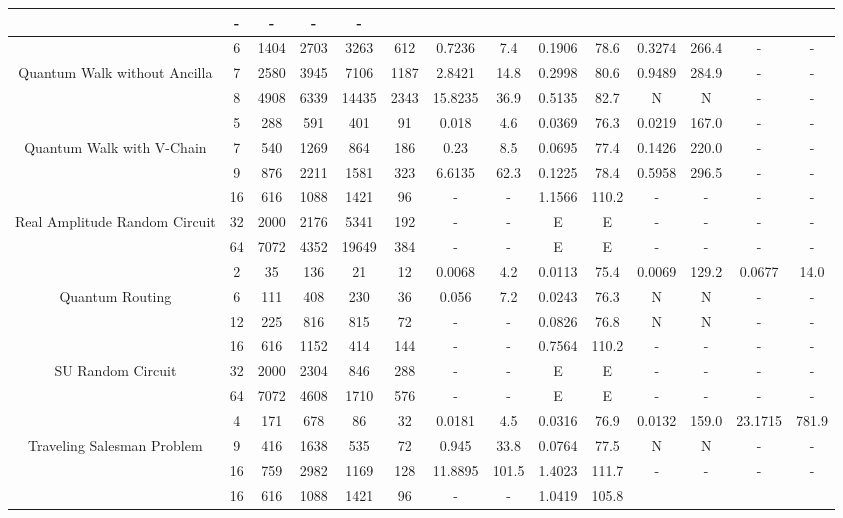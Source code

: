 \begin{table}[htb]
{\begin{tabular}{|c|c|c|c|c|c|c|c|c|c|c|c|c|c|}
 & - & -
 & - & -
 \\
\hline
 & 
6 & 1404 & 2703 & 3263 & 612
 & 0.7236 & 7.4
 & 0.1906 & 78.6
 & 0.3274 & 266.4
 & - & -
 \\
Quantum Walk without Ancilla & 
7 & 2580 & 3945 & 7106 & 1187
 & 2.8421 & 14.8
 & 0.2998 & 80.6
 & 0.9489 & 284.9
 & - & -
 \\
 & 
8 & 4908 & 6339 & 14435 & 2343
 & 15.8235 & 36.9
 & 0.5135 & 82.7
 & N & N 
 & - & -
 \\
\hline
 & 
5 & 288 & 591 & 401 & 91
 & 0.018 & 4.6
 & 0.0369 & 76.3
 & 0.0219 & 167.0
 & - & -
 \\
Quantum Walk with V-Chain & 
7 & 540 & 1269 & 864 & 186
 & 0.23 & 8.5
 & 0.0695 & 77.4
 & 0.1426 & 220.0
 & - & -
 \\
 & 
9 & 876 & 2211 & 1581 & 323
 & 6.6135 & 62.3
 & 0.1225 & 78.4
 & 0.5958 & 296.5
 & - & -
 \\
\hline
 & 
16 & 616 & 1088 & 1421 & 96
 & - & -
 & 1.1566 & 110.2
 & - & -
 & - & -
 \\
Real Amplitude Random Circuit & 
32 & 2000 & 2176 & 5341 & 192
 & - & -
 & E & E
 & - & -
 & - & -
 \\
 & 
64 & 7072 & 4352 & 19649 & 384
 & - & -
 & E & E
 & - & -
 & - & -
 \\
\hline
 & 
2 & 35 & 136 & 21 & 12
 & 0.0068 & 4.2
 & 0.0113 & 75.4
 & 0.0069 & 129.2
 & 0.0677 & 14.0
 \\
Quantum Routing & 
6 & 111 & 408 & 230 & 36
 & 0.056 & 7.2
 & 0.0243 & 76.3
 & N & N 
 & - & -
 \\
 & 
12 & 225 & 816 & 815 & 72
 & - & -
 & 0.0826 & 76.8
 & N & N 
 & - & -
 \\
\hline
 & 
16 & 616 & 1152 & 414 & 144
 & - & -
 & 0.7564 & 110.2
 & - & -
 & - & -
 \\
SU Random Circuit & 
32 & 2000 & 2304 & 846 & 288
 & - & -
 & E & E
 & - & -
 & - & -
 \\
 & 
64 & 7072 & 4608 & 1710 & 576
 & - & -
 & E & E
 & - & -
 & - & -
 \\
\hline
 & 
4 & 171 & 678 & 86 & 32
 & 0.0181 & 4.5
 & 0.0316 & 76.9
 & 0.0132 & 159.0
 & 23.1715 & 781.9
 \\
Traveling Salesman Problem & 
9 & 416 & 1638 & 535 & 72
 & 0.945 & 33.8
 & 0.0764 & 77.5
 & N & N 
 & - & -
 \\
 & 
16 & 759 & 2982 & 1169 & 128
 & 11.8895 & 101.5
 & 1.4023 & 111.7
 & - & -
 & - & -
 \\
\hline
 & 
16 & 616 & 1088 & 1421 & 96
 & - & -
 & 1.0419 & 105.8

\end{tabular}}
\end{table}
